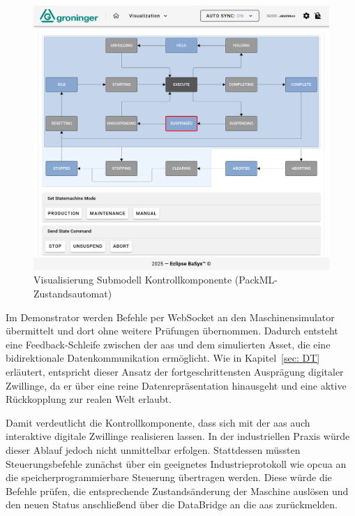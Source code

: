 \newpage
\begin{figure}[htbp]
    \centering 
    \includegraphics[width=1\textwidth]{Bilder/ErgebnisseAASWebUI/Kontrollkomponente.png} 
    \caption[Visualisierung Submodell Kontrollkomponente]{Visualisierung Submodell Kontrollkomponente (PackML-Zustandsautomat)} 
    \label{fig:PackMLZustandsautomat} 
\end{figure}
\vspace{-0.5em}


Im Demonstrator werden Befehle per WebSocket an den Maschinensimulator übermittelt und dort ohne weitere Prüfungen übernommen. 
Dadurch entsteht eine Feedback-Schleife zwischen der \acs{aas} und dem simulierten Asset, die eine bidirektionale Datenkommunikation ermöglicht. 
Wie in Kapitel~\ref{sec: DT} erläutert, entspricht dieser Ansatz der fortgeschrittensten Ausprägung digitaler Zwillinge, da er über eine reine Datenrepräsentation hinausgeht und eine aktive Rückkopplung zur realen Welt erlaubt. 

Damit verdeutlicht die Kontrollkomponente, dass sich mit der \acs{aas} auch interaktive digitale Zwillinge realisieren lassen. 
In der industriellen Praxis würde dieser Ablauf jedoch nicht unmittelbar erfolgen. 
Stattdessen müssten Steuerungsbefehle zunächst über ein geeignetes Industrieprotokoll wie \acs{opcua} an die speicherprogrammierbare Steuerung übertragen werden. 
Diese würde die Befehle prüfen, die entsprechende Zustandsänderung der Maschine auslösen und den neuen Status anschließend über die DataBridge an die \acs{aas} zurückmelden.

